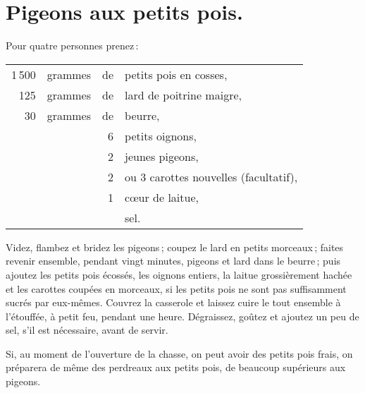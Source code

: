 \section*{\centering Pigeons aux petits pois.}
{}

Pour quatre personnes prenez :

\medskip

\footnotesize
\begin{longtable}{rrrp{16em}}
  1 500 & grammes & de & petits pois en cosses,                                                           \\
    125 & grammes & de & lard de poitrine maigre,                                                         \\
     30 & grammes & de & beurre,                                                                          \\
        &         &  6 & petits oignons,                                                                  \\
        &         &  2 & jeunes pigeons,                                                                  \\
        &         &  2 & ou 3 carottes nouvelles (facultatif),                                            \\
        &         &  1 & cœur de laitue,                                                                  \\
        &         &    & sel.                                                                             \\
\end{longtable}
\normalsize

Videz, flambez et bridez les pigeons ; coupez le lard en petits morceaux ;
faites revenir ensemble, pendant vingt minutes, pigeons et lard dans le
beurre ; puis ajoutez les petits pois écossés, les oignons entiers, la laitue
grossièrement hachée et les carottes coupées en morceaux, si les petits pois ne
sont pas suffisamment sucrés par eux-mêmes. Couvrez la casserole et laissez
cuire le tout ensemble à l'étouffée, à petit feu, pendant une heure.
Dégraissez, goûtez et ajoutez un peu de sel, s'il est nécessaire, avant de
servir.

\sk

Si, au moment de l'ouverture de la chasse, on peut avoir des petits pois frais,
on préparera de même des perdreaux aux petits pois, de beaucoup supérieurs aux
pigeons.

